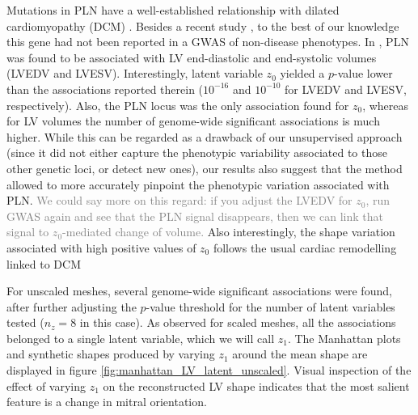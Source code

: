 Mutations in PLN have a well-established relationship with dilated cardiomyopathy (DCM) \cite{ref_Eijgenraam}. Besides a recent study \cite{ref_pirruccello}, to the best of our knowledge this gene had not been reported in a GWAS of non-disease phenotypes. In \cite{ref_pirruccello}, PLN was found to be associated with LV end-diastolic and end-systolic volumes (LVEDV and LVESV). Interestingly, latent variable $z_0$ yielded a $p$-value lower than the associations reported therein ($10^{-16}$ and $10^{-10}$ for LVEDV and LVESV, respectively). Also, the PLN locus was the only association found for $z_0$, whereas for LV volumes the number of genome-wide significant associations is much higher. 
While this can be regarded as a drawback of our unsupervised approach (since it did not either capture the phenotypic variability associated to those other genetic loci, or detect new ones), our results also suggest that the method allowed to more accurately pinpoint the phenotypic variation associated with PLN. \textcolor{gray}{We could say more on this regard: if you adjust the LVEDV for $z_0$, run GWAS again and see that the PLN signal disappears, then we can link that signal to $z_0$-mediated change of volume.}
Also interestingly, the shape variation associated with high positive values of $z_0$ follows the usual cardiac remodelling linked to DCM \cite{ref_dcm}

For unscaled meshes, several genome-wide significant associations were found, after further adjusting the $p$-value threshold for the number of latent variables tested ($n_z=8$ in this case). As observed for scaled meshes, all the associations belonged to a single latent variable, which we will call $z_1$. The Manhattan plots and synthetic shapes produced by varying $z_1$ around the mean shape are displayed in figure \ref{fig:manhattan_LV_latent_unscaled}. Visual inspection of the effect of varying $z_1$ on the reconstructed LV shape indicates that the most salient feature is a change in mitral orientation.


